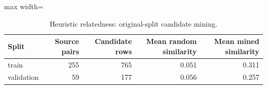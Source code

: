 \begin{table}[htbp]
\centering
\caption{Heuristic relatedness: original-split candidate mining.}
\label{tab:related-mining}
\small
\begin{adjustbox}{max width=\textwidth}
\begin{tabular}{lrrrr}
\toprule
Split & Source pairs & Candidate rows & Mean random similarity & Mean mined similarity \\
\midrule
train & 255 & 765 & 0.051 & 0.311 \\
validation & 59 & 177 & 0.056 & 0.257 \\
\bottomrule
\end{tabular}
\end{adjustbox}
\end{table}
